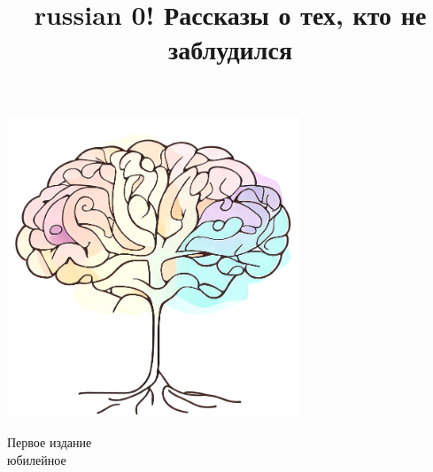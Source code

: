 \documentclass[a5paper,11pt]{memoir}
\title{\begin{otherlanguage*}{russian}
0! Рассказы о тех, кто не заблудился
\end{otherlanguage*}}
\author{}
\begin{document}

\date{} %
\maketitle
\begin{center}
\includegraphics[height=9cm]{images/tree-cover} 

\vspace{1cm}
\tiny{
Первое издание\\
юбилейное
}

\end{center}


\thispagestyle{empty}
\newpage
\thispagestyle{empty}  %


\clearpage
\hfill



\addto\captionsrussian{ 
}
\end{document}
